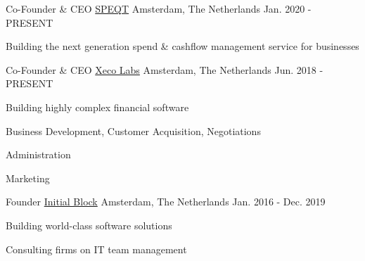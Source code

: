 

\begin{cventries}

  \cventry
    {Co-Founder \& CEO} %
    {\href{https://www.speqt.co}{SPEQT}} %
    {Amsterdam, The Netherlands} %
    {Jan. 2020 - PRESENT} %
    {
    \begin{cvitems} %
      \item {Building the next generation spend \& cashflow management service for businesses}
    \end{cvitems}
}


  \cventry
    {Co-Founder \& CEO} %
    {\href{https://www.xecolabs.com}{Xeco Labs}} %
    {Amsterdam, The Netherlands} %
    {Jun. 2018 - PRESENT} %
    {
    \begin{cvitems} %
      \item {Building highly complex financial software}
      \item {Business Development, Customer Acquisition, Negotiations}
      \item {Administration}
      \item {Marketing}
    \end{cvitems}
    }

  \cventry
    {Founder} %
    {\href{https://www.initialblock.com}{Initial Block}} %
    {Amsterdam, The Netherlands} %
    {Jan. 2016 - Dec. 2019} %
    {
    \begin{cvitems} %
      \item {Building world-class software solutions}
      \item {Consulting firms on IT team management}
    \end{cvitems}
    }


\end{cventries}
